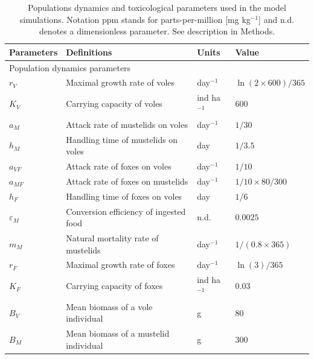 \documentclass[11pt]{article}
\begin{document}

%

%



\newpage


\begin{table}
\caption{Populations dynamics and toxicological parameters used in the model simulations. Notation ppm stands for parts-per-million [mg kg$^{-1}$] and n.d. denotes a dimensionless parameter. See description in Methods.}
\label{tab:parameterization}
\begin{tabular}{l p{7cm} l p{3cm}}
\hline
Parameters & Definitions & Units & Value\\
\hline
\multicolumn{2}{l}{Population dynamics parameters}  & & \\
\hline
%
$r_V$ & Maximal growth rate of voles & day$^{-1}$ & $\ln(2\times600)/365$ \\
$K_V$ & Carrying capacity of voles & ind ha$^{-1}$ & $600$  \\
%
%
$a_M$ & Attack rate of mustelids on voles & day$^{-1}$ & $1/30$ \\
$h_M$ &  Handling time of mustelids on voles & day & $1/3.5$\\
$a_{VF}$ & Attack rate of foxes on voles & day$^{-1}$ & $1/10$ \\
$a_{MF}$ & Attack rate of foxes on mustelids & day$^{-1}$ & $1/10 \times 80/300$ \\
$h_F$ &  Handling time of foxes on voles & day & $1/6$\\
%
%
$\varepsilon_M$ & Conversion efficiency of ingested food & n.d. & $0.0025$ \\
$m_M$ & Natural mortality rate of mustelids & day$^{-1}$ & $1/(0.8 \times 365)$\\
%
%
$r_F$ & Maximal growth rate of foxes & day$^{-1}$ & $\ln(3)/365$ \\
$K_F$ & Carrying capacity of foxes & ind ha$^{-1}$ & $0.03$ \\
%
%
$B_V$ & Mean biomass of a vole individual & g & $80$ \\
$B_M$ & Mean biomass of a mustelid individual & g & $300$ \\

\end{tabular}
\end{table}
\end{document}
